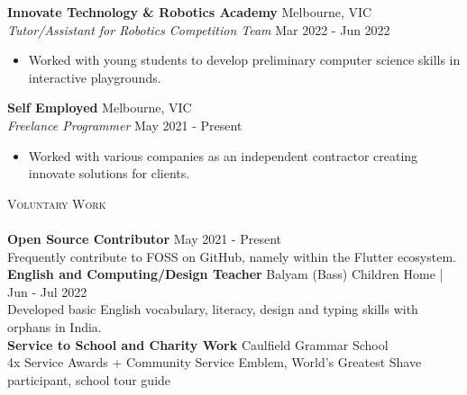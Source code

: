 \documentclass[a4paper]{article}
\newcommand{\lineunder} {
    \vspace*{-8pt} \\
    \hspace*{-18pt} \hrulefill \\
}
\newcommand{\header} [1] {
    {\hspace*{-18pt}\vspace*{6pt} \textsc{#1}}
    \vspace*{-6pt} \lineunder
}
\begin{document}
\textbf{Innovate Technology \& Robotics Academy} \hfill Melbourne, VIC\\
\textit{Tutor/Assistant for Robotics Competition Team} \hfill Mar 2022 - Jun 2022\\
\vspace{-3mm}
\begin{itemize} \itemsep 0.5pt
	\item Worked with young students to develop preliminary computer science skills in interactive playgrounds.
\end{itemize}
\vspace{-2mm}

\textbf{Self Employed} \hfill Melbourne, VIC\\
\textit{Freelance Programmer} \hfill May 2021 - Present\\
\vspace{-3mm}
\begin{itemize} \itemsep 0.5pt
	\item Worked with various companies as an independent contractor creating innovate solutions for clients.
\end{itemize}
\vspace{-2mm}

\header{Voluntary Work}
{\textbf{Open Source Contributor}} \hfill May 2021 - Present\\
Frequently contribute to FOSS on GitHub, namely within the Flutter ecosystem.\\
\vspace*{2mm}
{\textbf{English and Computing/Design Teacher}} \hfill Balyam (Bass) Children Home | Jun - Jul 2022\\
Developed basic English vocabulary, literacy, design and typing skills with orphans in India. \\
\vspace*{2mm}
{\textbf{Service to School and Charity Work}} \hfill Caulfield Grammar School\\
4x Service Awards + Community Service Emblem, World's Greatest Shave participant, school tour guide\\
\vspace*{2mm}
\end{document}
